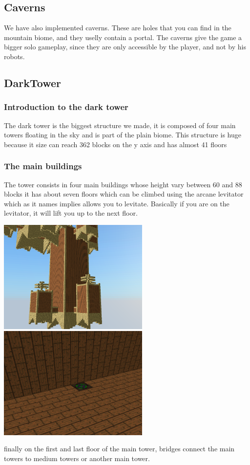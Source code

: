 \documentclass[article]{report}         %
\begin{document}
          \subsection{Caverns}
            We have also implemented caverns. These are holes that you can find in the mountain biome, and they uselly contain a portal. The caverns give the game a bigger solo gameplay, since they are only accessible by the player, and not by his robots.
          \subsection{DarkTower}
        \subsubsection{Introduction to the dark tower}
          The dark tower is the biggest structure we made, it is composed of four main towers floating in the sky and is part of the plain biome. This structure is huge because it size can reach 362 blocks on the y axis and has almost 41 floors

        \subsubsection{The main buildings}
          The tower consists in four main buildings whose height vary between 60 and 88 blocks it has about seven floors which can be climbed using the arcane levitator which as it names implies allows you to levitate. Basically if you are on the levitator, it will lift you up to the next floor.

          \begin{center}
            \includegraphics[width=7.5cm]{images/DT/Main.png}
            \includegraphics[width=7.5cm]{images/DT/floor.png}
          \end{center}
        finally on the first and last floor of the main tower, bridges connect the main towers to medium towers or another main tower.
\end{document}
